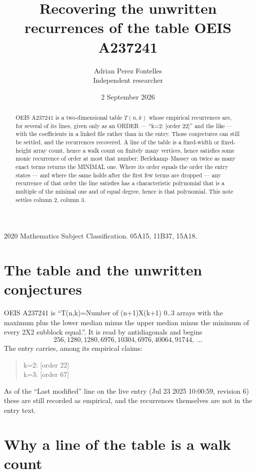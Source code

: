 \documentclass[11pt,a4paper]{article}
\title{Recovering the unwritten recurrences of the table OEIS A237241}
\author{Adrian Perez Fontelles\\ \small Independent researcher}
\date{2 September 2026}
\theoremstyle{plain}
\theoremstyle{definition}
\begin{document}
\maketitle

\begin{abstract}
OEIS A237241 is a two-dimensional table $T(n,k)$ whose empirical recurrences are, for several of
its lines, given only as an ORDER --- ``k=2: [order 22]'' and the like --- with the
coefficients in a linked file rather than in the entry. Those conjectures can still be settled,
and the recurrences recovered. A line of the table is a fixed-width or fixed-height array
count, hence a walk count on finitely many vertices, hence satisfies some monic recurrence of
order at most that number; Berlekamp--Massey on twice as many exact terms returns the MINIMAL
one. Where its order equals the order the entry states --- and where the same holds after the
first few terms are dropped --- any recurrence of that order the line satisfies has a
characteristic polynomial that is a multiple of the minimal one and of equal degree, hence is
that polynomial. This note settles column 2, column 3.
\end{abstract}

\noindent\small 2020 Mathematics Subject Classification. 05A15, 11B37, 15A18.\normalsize

\section{The table and the unwritten conjectures}

OEIS A237241 is ``T(n,k)=Number of (n+1)X(k+1) 0..3 arrays with the maximum plus the lower median minus the upper median minus the minimum of every 2X2 subblock equal.''. It is read by antidiagonals and begins
\[
256, 1280, 1280, 6976, 10304, 6976, 40064, 91744,\ \dots
\]
The entry carries, among its empirical claims:
\begin{quote}\small
k=2: [order 22]\\
k=3: [order 67]
\end{quote}
As of the ``Last modified'' line on the live entry (Jul 23 2025 10:00:59, revision 6) these are still
recorded as empirical, and the recurrences themselves are not in the entry text.

\section{Why a line of the table is a walk count}
\end{document}
